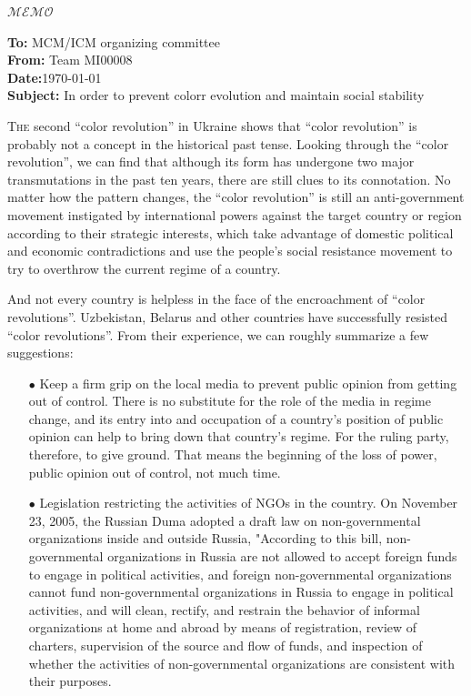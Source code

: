 \documentclass[12pt]{article}  %
\begin{document}
\begin{letter}{\huge{$\mathscr{MEMO}$}}
\begin{flushleft}  %
\textbf{To:} MCM/ICM organizing committee\\
\textbf{From:} Team MI00008\\
\textbf{Date:}\today\\
\textbf{Subject:} In order to prevent colorr evolution and maintain social stability
\end{flushleft}
\lettrine{T}{he} second ``color revolution'' in Ukraine shows that ``color revolution'' is probably not a concept in the historical past tense. Looking through the ``color revolution'', we can find that although its form has undergone two major transmutations in the past ten years, there are still clues to its connotation. No matter how the pattern changes, the ``color revolution'' is still an anti-government movement instigated by international powers against the target country or region according to their strategic interests, which take advantage of domestic political and economic contradictions and use the people's social resistance movement to try to overthrow the current regime of a country.

And not every country is helpless in the face of the encroachment of ``color revolutions''. Uzbekistan, Belarus and other countries have successfully resisted ``color revolutions''. From their experience, we can roughly summarize a few suggestions:

{\itshape \begin{enumerate}[0]
    \item[$\bullet$] Keep a firm grip on the local media to prevent public opinion from getting out of control. There is no substitute for the role of the media in regime change, and its entry into and occupation of a country's position of public opinion can help to bring down that country's regime. For the ruling party, therefore, to give ground. That means the beginning of the loss of power, public opinion out of control, not much time.

    \item[$\bullet$] Legislation restricting the activities of NGOs in the country. On November 23, 2005, the Russian Duma adopted a draft law on non-governmental organizations inside and outside Russia, "According to this bill, non-governmental organizations in Russia are not allowed to accept foreign funds to engage in political activities, and foreign non-governmental organizations cannot fund non-governmental organizations in Russia to engage in political activities, and will clean, rectify, and restrain the behavior of informal organizations at home and abroad by means of registration, review of charters, supervision of the source and flow of funds, and inspection of whether the activities of non-governmental organizations are consistent with their purposes.



\end{enumerate}}
\end{letter}
\end{document}
